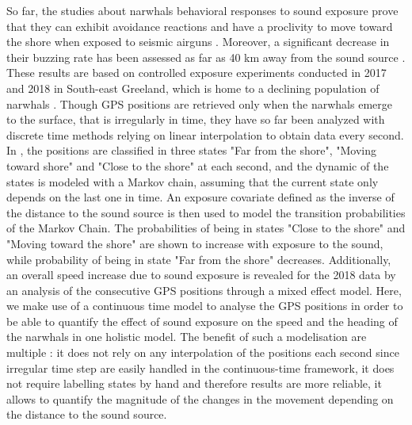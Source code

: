 \documentclass[11pt]{article}
\newcommand {\1}{\mathbb{1}}
\theoremstyle{definition}
\theoremstyle{remark}
\theoremstyle{remark}
\begin{document}
So far, the studies about narwhals behavioral responses to sound exposure prove that they can exhibit avoidance reactions and have a proclivity to move toward the shore when exposed to seismic airguns \cite{heide-jorgensen_behavioral_2021}. Moreover, a significant decrease in their buzzing rate has been assessed as far as 40 km away from the sound source \cite{tervo_narwhals_2021}. These results are based on controlled exposure experiments conducted in 2017 and 2018 in South-east Greeland, which is home to a declining population of narwhals \cite{garde_biological_2022}.  Though GPS positions are retrieved only when the narwhals emerge to the surface, that is irregularly in time, they have so far been analyzed with discrete time methods relying on linear interpolation to obtain data every second. In \cite{heide-jorgensen_behavioral_2021}, the positions are classified in three states "Far from the shore", "Moving toward shore" and "Close to the shore" at each second, and the dynamic of the states is modeled with a Markov chain, assuming that the current state only depends on the last one in time. An exposure covariate defined as the inverse of the distance to the sound source is then used to model the transition probabilities of the Markov Chain. The probabilities of being in states "Close to the shore" and "Moving toward the shore" are shown to increase with exposure to the sound, while probability of being in state "Far from the shore" decreases. Additionally, an overall speed increase due to sound exposure is revealed for the 2018 data by an analysis of the consecutive GPS positions through a mixed effect model. 
Here, we  make use of a continuous time model to analyse the GPS positions in order to be able to quantify the effect of sound exposure on the speed and the heading of the narwhals in one holistic model. The benefit of such a modelisation are multiple : it does not rely on any interpolation of the positions each second since irregular time step are easily handled in the continuous-time framework, it does not require labelling states by hand and therefore results are more reliable, it allows to quantify the magnitude of the changes in the movement depending on the distance to the sound source. \\
\end{document}

